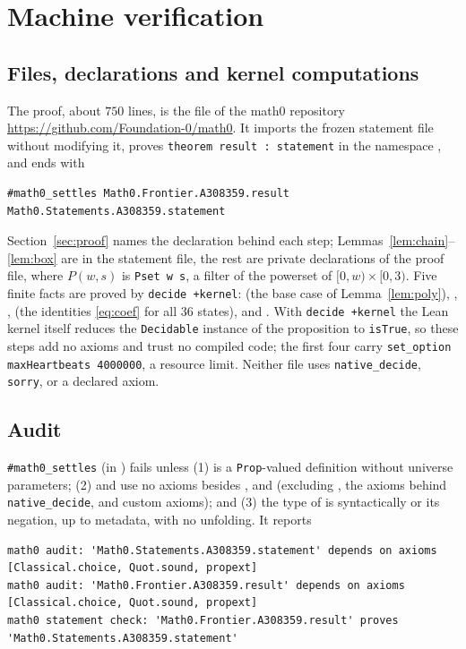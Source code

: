 \documentclass[11pt]{amsart}
\theoremstyle{plain}
\theoremstyle{definition}
\newcommand{\code}[1]{\texttt{#1}}
\begin{document}
\section{Machine verification}\label{sec:lean}

\subsection*{Files, declarations and kernel computations}
The proof, about $750$ lines, is the file  of the math0 repository \url{https://github.com/Foundation-0/math0}. It imports the frozen statement file without modifying it, proves \code{theorem result : statement} in the namespace , and ends with
\begin{lstlisting}
#math0_settles Math0.Frontier.A308359.result Math0.Statements.A308359.statement
\end{lstlisting}
Section~\ref{sec:proof} names the declaration behind each step; Lemmas~\ref{lem:chain}--\ref{lem:box} are in the statement file, the rest are private declarations of the proof file, where $P(w,s)$ is \code{Pset w s}, a filter of the powerset of $[0,w)\times[0,3)$. Five finite facts are proved by \texttt{decide +kernel}:  (the base case of Lemma~\ref{lem:poly}), , ,  (the identities \eqref{eq:coef} for all $36$ states), and . With \texttt{decide +kernel} the Lean kernel itself reduces the \code{Decidable} instance of the proposition to \code{isTrue}, so these steps add no axioms and trust no compiled code; the first four carry \texttt{set\_option maxHeartbeats 4000000}, a resource limit. Neither file uses \texttt{native\_decide}, \texttt{sorry}, or a declared axiom.

\subsection*{Audit}
\texttt{\#math0\_settles} (in ) fails unless (1)  is a \texttt{Prop}-valued definition without universe parameters; (2)  and  use no axioms besides ,  and  (excluding , the axioms behind \texttt{native\_decide}, and custom axioms); and (3) the type of  is syntactically  or its negation, up to metadata, with no unfolding. It reports
\begin{lstlisting}[basicstyle=\ttfamily\scriptsize]
math0 audit: 'Math0.Statements.A308359.statement' depends on axioms [Classical.choice, Quot.sound, propext]
math0 audit: 'Math0.Frontier.A308359.result' depends on axioms [Classical.choice, Quot.sound, propext]
math0 statement check: 'Math0.Frontier.A308359.result' proves 'Math0.Statements.A308359.statement'
\end{lstlisting}
\end{document}
